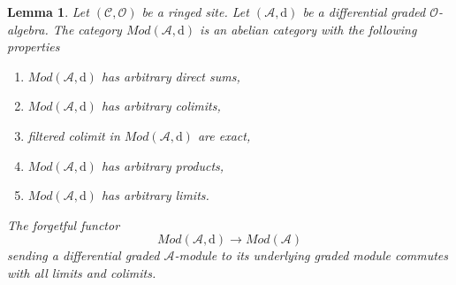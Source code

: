 \documentclass{stacks-project}
\theoremstyle{plain}
\newtheorem{lemma}[subsection]{Lemma}
\theoremstyle{definition}
\theoremstyle{remark}
\numberwithin{equation}{subsection}
\begin{document}
\begin{lemma}
\label{lemma-dgm-abelian}
Let $(\mathcal{C}, \mathcal{O})$ be a ringed site.
Let $(\mathcal{A}, \text{d})$ be a differential graded $\mathcal{O}$-algebra.
The category $\textit{Mod}(\mathcal{A}, \text{d})$ is an abelian category
with the following properties
\begin{enumerate}
\item $\textit{Mod}(\mathcal{A}, \text{d})$ has arbitrary direct sums,
\item $\textit{Mod}(\mathcal{A}, \text{d})$ has arbitrary colimits,
\item filtered colimit in $\textit{Mod}(\mathcal{A}, \text{d})$ are exact,
\item $\textit{Mod}(\mathcal{A}, \text{d})$ has arbitrary products,
\item $\textit{Mod}(\mathcal{A}, \text{d})$ has arbitrary limits.
\end{enumerate}
The forgetful functor
$$
\textit{Mod}(\mathcal{A}, \text{d})
\longrightarrow
\textit{Mod}(\mathcal{A})
$$
sending a differential graded $\mathcal{A}$-module to its underlying
graded module commutes with all limits and colimits.
\end{lemma}
\end{document}
